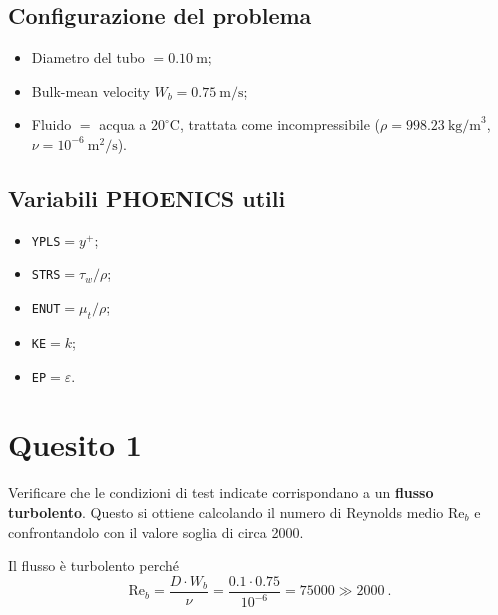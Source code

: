 \subsection*{Configurazione del problema}

\begin{itemize}
    \item Diametro del tubo $= 0.10~\text{m}$;
    \item Bulk-mean velocity $W_b = 0.75~\text{m/s}$;
    \item Fluido $=$ acqua a $20^\circ$C, trattata come incompressibile ($\rho = 998.23~\text{kg/m}^3$, $\nu = 10^{-6}~\text{m}^2/\text{s}$).
\end{itemize}

\subsection*{Variabili PHOENICS utili}

\begin{itemize}
    \item \texttt{YPLS}$=y^+$;
    \item \texttt{STRS}$=\tau_w/\rho$;
    \item \texttt{ENUT}$=\mu_t/\rho$;
    \item \texttt{KE}$=k$;
    \item \texttt{EP}$=\varepsilon$.
\end{itemize}

\section{Quesito 1}

Verificare che le condizioni di test indicate corrispondano a un \textbf{flusso turbolento}. Questo si ottiene calcolando il numero di Reynolds medio $\text{Re}_b$ e confrontandolo con il valore soglia di circa 2000.

\NotionDivider

Il flusso è turbolento perché
\begin{equation}
\label{eq:re2}
\text{Re}_b=\frac{D\cdot W_b}{\nu}=\frac{0.1\cdot 0.75}{10^{-6}}=75000\gg 2000\ .  
\end{equation}












